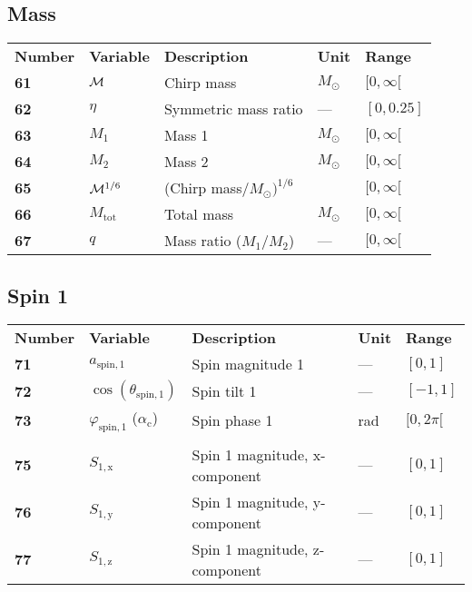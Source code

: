 \subsection{Mass}
\begin{tabular}{lllll}
  \textbf{Number} & \textbf{Variable} & \textbf{Description} & \textbf{Unit} & \textbf{Range} \\
  \textbf{61} & $\cal{M}$  & Chirp mass & $M_\odot$ & $[0,\infty[$ \\
  \textbf{62} & $\eta$  & Symmetric mass ratio & --- & $[0,0.25]$ \\
  \textbf{63} & $M_1$  & Mass 1 & $M_\odot$ & $[0,\infty[$ \\
  \textbf{64} & $M_2$  & Mass 2 & $M_\odot$ &  $[0,\infty[$ \\
  \textbf{65} & ${\cal M}^{1/6}$  & (Chirp mass/$M_\odot)^{1/6}$ & & $[0,\infty[$ \\
  \textbf{66} & $M_\mathrm{tot}$  & Total mass & $M_\odot$ & $[0,\infty[$ \\
  \textbf{67} & $q$  & Mass ratio ($M_1/M_2$) & --- & $[0,\infty[$ \\
\end{tabular}

\subsection{Spin 1}
\begin{tabular}{lllll}
  \textbf{Number} & \textbf{Variable} & \textbf{Description} & \textbf{Unit} & \textbf{Range} \\
  \textbf{71} & $a_\mathrm{spin,1}$  & Spin magnitude 1 & --- & $[0,1]$ \\
  \textbf{72} & $\cos(\theta_\mathrm{spin,1})$  & Spin tilt 1 & --- & $[-1,1]$ \\
  \textbf{73} & $\varphi_\mathrm{spin,1}$  ($\alpha_\mathrm{c}$)  & Spin phase 1 & rad & $[0,2\pi[$ \\
      & & & & \\
  \textbf{75} & $S_\mathrm{1,x}$  & Spin 1 magnitude, x-component & --- & $[0,1]$ \\
  \textbf{76} & $S_\mathrm{1,y}$  & Spin 1 magnitude, y-component & --- & $[0,1]$ \\
  \textbf{77} & $S_\mathrm{1,z}$  & Spin 1 magnitude, z-component & --- & $[0,1]$ \\
\end{tabular}

